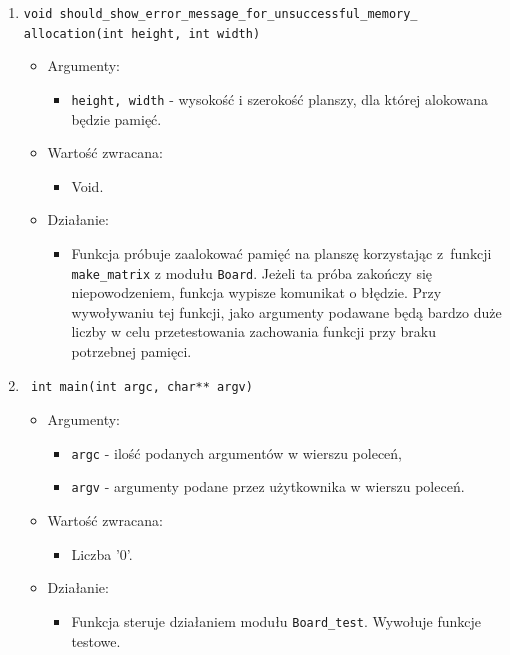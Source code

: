 \documentclass[a4paper,11pt, notitlepage ]{article}
\begin{document}
\begin{enumerate}
\item \verb+void should_show_error_message_for_unsuccessful_memory_+ \\\verb+allocation(int height, int width)+
\begin{itemize}
\item Argumenty:
\begin{itemize}
\item \verb+height, width+ - wysokość i szerokość planszy, dla której alokowana będzie pamięć. 
\end{itemize}
\item Wartość zwracana:
\begin{itemize}
\item Void.
\end{itemize}
\item Działanie:
\begin{itemize}
\item Funkcja próbuje zaalokować pamięć na planszę korzystając z~funkcji \verb+make_matrix+ z modułu \verb+Board+. Jeżeli ta próba zakończy się niepowodzeniem, funkcja wypisze komunikat o błędzie. Przy wywoływaniu tej funkcji, jako 
argumenty podawane będą bardzo duże liczby w celu przetestowania zachowania funkcji przy braku potrzebnej pamięci. 
\end{itemize}
\end{itemize}


\item \begin{verbatim} int main(int argc, char** argv) \end{verbatim}
\begin{itemize}
\item Argumenty:
\begin{itemize}
\item \verb+argc+ - ilość podanych argumentów w wierszu poleceń,
\item \verb+argv+ - argumenty podane przez użytkownika w wierszu poleceń.
\end{itemize}
\item Wartość zwracana:
\begin{itemize}
\item Liczba '0'.
\end{itemize}
\item Działanie:
\begin{itemize}
\item Funkcja steruje działaniem modułu \verb+Board_test+. Wywołuje funkcje testowe.
\end{itemize}
\end{itemize}


\end{enumerate}
\end{document}
